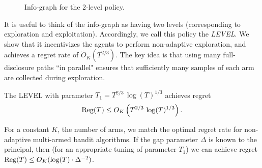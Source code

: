 \begin{figure}[H]
\centering
{}

\caption{Info-graph for the 2-level policy. }
\label{fig:2level}
\end{figure}


It is useful to think of the info-graph as having two levels (corresponding to exploration and exploitation). Accordingly, we call this policy the \emph{\2LEVEL}. We show that it incentivizes the agents to perform non-adaptive exploration, and achieves a regret rate of  $\tilde O_K(T^{2/3})$. The key idea is that using many full-disclosure paths ``in parallel" ensures that sufficiently many samples of each arm are collected during exploration.

\begin{theorem}\label{thm:2level}
The \2LEVEL with parameter $T_1 = T^{2/3}\,\log(T)^{1/3}$ achieves regret
\[ \mathrm{Reg}(T) \leq O_K\left( T^{2/3}\, \log(T)^{1/3} \right).\]
\end{theorem}

\begin{remark}
For a constant $K$, the number of arms, we match the optimal regret rate for non-adaptive multi-armed bandit algorithms. If the gap parameter $\Delta$ is known to the principal, then (for an appropriate tuning of parameter $T_1$) we can achieve regret 
  $\mathrm{Reg}(T) \leq O_K(\log(T) \cdot \Delta^{-2})$.
\end{remark}

